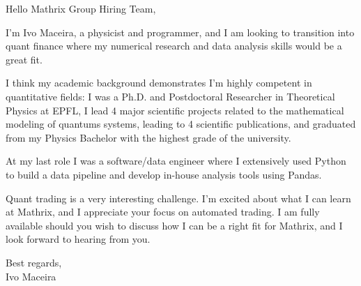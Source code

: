 \documentclass[a4paper,12pt]{letter}
\begin{document}
Hello Mathrix Group Hiring Team,

I'm Ivo Maceira, a physicist and programmer, and I am looking to transition into quant finance where my numerical research and data analysis skills would be a great fit.

I think my academic background demonstrates I'm highly competent in quantitative fields: I was a Ph.D. and Postdoctoral Researcher in Theoretical Physics at EPFL, I lead 4 major scientific projects related to the mathematical modeling of quantums systems, leading to 4 scientific publications, and graduated from my Physics Bachelor with the highest grade of the university.

At my last role I was a software/data engineer where I extensively used Python to build a data pipeline and develop in-house analysis tools using Pandas.

Quant trading is a very interesting challenge. I'm excited about what I can learn at Mathrix, and I appreciate your focus on automated trading. I am fully available should you wish to discuss how I can be a right fit for Mathrix, and I look forward to hearing from you.

Best regards, \\
Ivo Maceira
\end{document}

